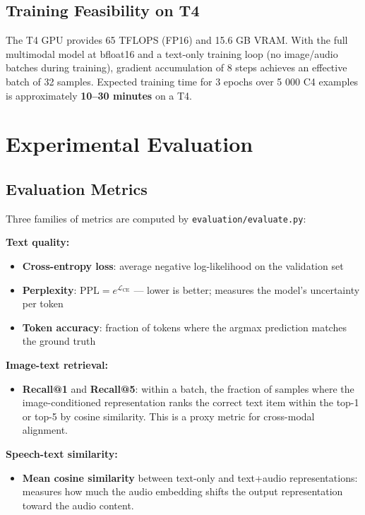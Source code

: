 \documentclass[11pt]{article}
\begin{document}
\subsection{Training Feasibility on T4}


The T4 GPU provides 65 TFLOPS (FP16) and 15.6 GB VRAM. With the full multimodal model at bfloat16 and a text-only training loop (no image/audio batches during training), gradient accumulation of 8 steps achieves an effective batch of 32 samples. Expected training time for 3 epochs over 5 000 C4 examples is approximately \textbf{10–30 minutes} on a T4.



\section{Experimental Evaluation}


\subsection{Evaluation Metrics}


Three families of metrics are computed by \texttt{evaluation/evaluate.py}:


\textbf{Text quality:}

\begin{itemize}[leftmargin=*]
\item \textbf{Cross-entropy loss}: average negative log-likelihood on the validation set
\item \textbf{Perplexity}: $\text{PPL} = e^{\mathcal{L}_{\text{CE}}}$ — lower is better; measures the model's uncertainty per token
\item \textbf{Token accuracy}: fraction of tokens where the argmax prediction matches the ground truth

\end{itemize}
\textbf{Image-text retrieval:}

\begin{itemize}[leftmargin=*]
\item \textbf{Recall@1} and \textbf{Recall@5}: within a batch, the fraction of samples where the image-conditioned representation ranks the correct text item within the top-1 or top-5 by cosine similarity. This is a proxy metric for cross-modal alignment.

\end{itemize}
\textbf{Speech-text similarity:}

\begin{itemize}[leftmargin=*]
\item \textbf{Mean cosine similarity} between text-only and text+audio representations: measures how much the audio embedding shifts the output representation toward the audio content.

\end{itemize}
\end{document}
